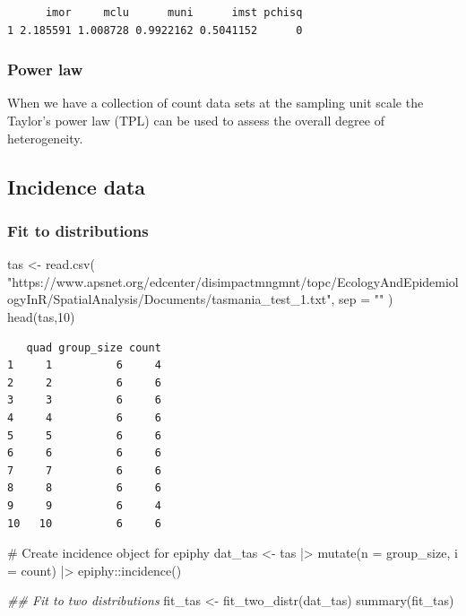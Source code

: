 \documentclass[
  letterpaper,
  DIV=11,
  numbers=noendperiod]{scrreprt}
\newenvironment{Shaded}{\begin{snugshade}}{\end{snugshade}}
\newcommand{\AttributeTok}[1]{\textcolor[rgb]{0.40,0.45,0.13}{#1}}
\newcommand{\CommentTok}[1]{\textcolor[rgb]{0.37,0.37,0.37}{#1}}
\newcommand{\DecValTok}[1]{\textcolor[rgb]{0.68,0.00,0.00}{#1}}
\newcommand{\DocumentationTok}[1]{\textcolor[rgb]{0.37,0.37,0.37}{\textit{#1}}}
\newcommand{\FunctionTok}[1]{\textcolor[rgb]{0.28,0.35,0.67}{#1}}
\newcommand{\NormalTok}[1]{\textcolor[rgb]{0.00,0.23,0.31}{#1}}
\newcommand{\OtherTok}[1]{\textcolor[rgb]{0.00,0.23,0.31}{#1}}
\newcommand{\SpecialCharTok}[1]{\textcolor[rgb]{0.37,0.37,0.37}{#1}}
\newcommand{\StringTok}[1]{\textcolor[rgb]{0.13,0.47,0.30}{#1}}
\begin{document}
\begin{verbatim}
      imor     mclu      muni      imst pchisq
1 2.185591 1.008728 0.9922162 0.5041152      0
\end{verbatim}

\hypertarget{power-law}{%
\subsubsection{Power law}\label{power-law}}

When we have a collection of count data sets at the sampling unit scale
the Taylor's power law (TPL) can be used to assess the overall degree of
heterogeneity.

\hypertarget{incidence-data-1}{%
\subsection{Incidence data}\label{incidence-data-1}}

\hypertarget{fit-to-distributions-1}{%
\subsubsection{Fit to distributions}\label{fit-to-distributions-1}}

\begin{Shaded}
\begin{Highlighting}[]
\NormalTok{tas }\OtherTok{\textless{}{-}}
  \FunctionTok{read.csv}\NormalTok{(}
    \StringTok{"https://www.apsnet.org/edcenter/disimpactmngmnt/topc/EcologyAndEpidemiologyInR/SpatialAnalysis/Documents/tasmania\_test\_1.txt"}\NormalTok{,}
    \AttributeTok{sep =} \StringTok{""}
\NormalTok{  )}
\FunctionTok{head}\NormalTok{(tas,}\DecValTok{10}\NormalTok{)}
\end{Highlighting}
\end{Shaded}

\begin{verbatim}
   quad group_size count
1     1          6     4
2     2          6     6
3     3          6     6
4     4          6     6
5     5          6     6
6     6          6     6
7     7          6     6
8     8          6     6
9     9          6     4
10   10          6     6
\end{verbatim}

\begin{Shaded}
\begin{Highlighting}[]
\CommentTok{\# Create incidence object for epiphy}
\NormalTok{dat\_tas }\OtherTok{\textless{}{-}}\NormalTok{ tas }\SpecialCharTok{|\textgreater{}}
  \FunctionTok{mutate}\NormalTok{(}\AttributeTok{n =}\NormalTok{ group\_size, }\AttributeTok{i =}\NormalTok{ count) }\SpecialCharTok{|\textgreater{}}
\NormalTok{  epiphy}\SpecialCharTok{::}\FunctionTok{incidence}\NormalTok{()}

\DocumentationTok{\#\# Fit to two distributions}
\NormalTok{fit\_tas }\OtherTok{\textless{}{-}} \FunctionTok{fit\_two\_distr}\NormalTok{(dat\_tas)}
\FunctionTok{summary}\NormalTok{(fit\_tas)}
\end{Highlighting}
\end{Shaded}
\end{document}
